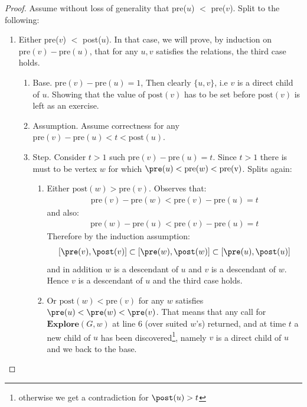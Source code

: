 
  \begin{proof} 
      Assume without loss of generality that pre($u$) $<$ pre($v$). Split to the following:
	\begin{enumerate}
	  \item Either pre($v$) $<$ post($u$). In that case, we will prove, by induction on $\text{pre}(v)-\text{pre}(u)$, that for any $u,v$ satisfies the relations, the third case holds. 
	    \begin{enumerate}
	      \item Base. $\text{pre}(v)-\text{pre}(u) = 1$, Then clearly $\{u,v\}$, i.e $v$ is a direct child of $u$. Showing that the value of $\text{post}(v)$ has to be set before  $\text{post}(v)$ is left as an exercise. 
	      \item Assumption. Assume correctness for any $\text{pre}(v)-\text{pre}(u) < t < \text{post}(u)$.
	      \item Step. Consider $t > 1$ such  $\text{pre}(v)-\text{pre}(u) = t$. Since $t > 1$ there is must to be vertex $w$ for which $\pre(u) < \text{pre}(w) < \text{pre(v)}$. Splits again:  
		\begin{enumerate}
		  \item Either $\text{post}(w) > \text{pre}(v)$. Observes that: \begin{equation*}
		      \begin{split}
\text{pre}(v) - \text{pre}(w) < \text{pre}(v) - \text{pre}(u) = t
		      \end{split}
		    \end{equation*}
		     and also: \begin{equation*}
		       \begin{split}
\text{pre}(w) - \text{pre}(u) < \text{pre}(v) - \text{pre}(u) = t
		       \end{split}
		     \end{equation*}
		      Therefore by the induction assumption: \begin{equation*}
			\begin{split}
[\pre(v),\post(v)] \subset [\pre(w),\post(w)]\subset [\pre(u),\post(u)]
			\end{split}
		      \end{equation*} and in addition $w$ is a descendant of $u$ and $v$ is a descendant of $w$. Hence $v$ is a descendant of $u$ and the third case holds. 
		    \item Or $\text{post}(w) < \text{pre}(v)$ for any $w$ satisfies $\pre(u) < \pre(w) < \pre(v)$. That means that any call for $\textbf{Explore}(G,w)$ at line $6$ (over suited $w$'s) returned, and at time $t$ a new child of $u$ has been discovered\footnote{otherwise we get a contradiction for $\post(u) > t$}, namely $v$ is a direct child of $u$ and we back to the base.
		\end{enumerate}
	    \end{enumerate}
	    

\end{enumerate}
\end{proof}
